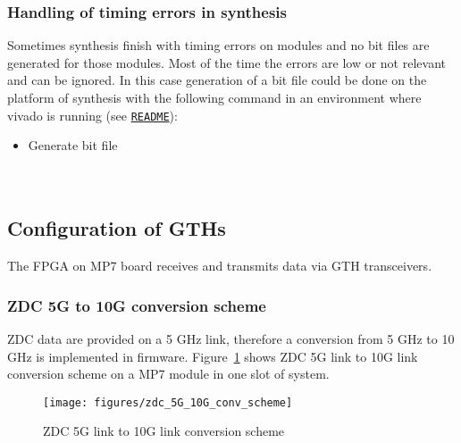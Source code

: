 \subsubsection{Handling of timing errors in synthesis}\label{sec:app:synth_timing_errors}

Sometimes synthesis finish with timing errors on modules and no bit files are generated for those modules.
Most of the time the errors are low or not relevant and can be ignored. In this case generation
of a bit file could be done on the platform of synthesis with the following command in an environment where
vivado is running (see \href{\gitbranch/README.md}{\texttt{README}}):\\
\begin{itemize}
\item Generate bit file\\
\\
\\
\end{itemize}

\clearpage

\subsection{Configuration of GTHs}\label{sec:app:app_a}

The FPGA on MP7 board receives and transmits data via GTH transceivers.\\

\subsubsection{ZDC 5G to 10G conversion scheme}\label{sec:app:zdc_5g_10g_conv}

ZDC data are provided on a 5 GHz link, therefore a conversion from 5 GHz to 10 GHz is implemented in \ugt firmware.
Figure~\ref{fig:app:zdc_5G_10G_conv_scheme} shows ZDC 5G link to 10G link conversion scheme on a MP7 module in one slot of \ugt system.\\

\begin{figure}[htb]
\centering
\texttt{[image: figures/zdc\_5G\_10G\_conv\_scheme]}
\caption{ZDC 5G link to 10G link conversion scheme}
\label{fig:app:zdc_5G_10G_conv_scheme}
\end{figure}

